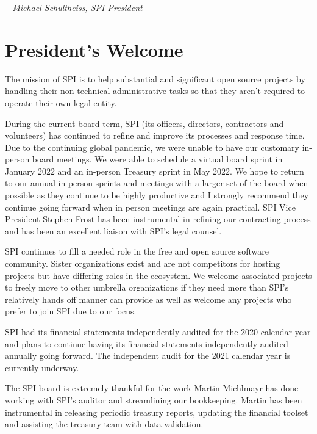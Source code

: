 \documentclass[a4paper]{report}
\begin{document}
  \emph{-- Michael Schultheiss, SPI President}

\newpage

\tableofcontents

\newpage

\chapter{President's Welcome}
\label{sec:president}

The mission of SPI is to help substantial and significant open source
projects by handling their non-technical administrative tasks so that
they aren't required to operate their own legal entity.

During the current board term, SPI (its officers, directors, contractors
and volunteers) has continued to refine and improve its processes and
response time.  Due to the continuing global pandemic, we were unable to
have our customary in-person board meetings. We were able to schedule
a virtual board sprint in January 2022 and an in-person Treasury sprint
in May 2022. We hope to return to our annual in-person sprints and
meetings with a larger set of the board when possible as they continue
to be highly productive and I strongly recommend they continue going
forward when in person meetings are again practical. SPI Vice President
Stephen Frost has been instrumental in refining our contracting process
and has been an excellent liaison with SPI's legal counsel.

SPI continues to fill a needed role in the free and open source software
community. Sister organizations exist and are not competitors for
hosting projects but have differing roles in the ecosystem. We welcome
associated projects to freely move to other umbrella organizations if
they need more than SPI's relatively hands off manner can provide as
well as welcome any projects who prefer to join SPI due to our focus.

SPI had its financial statements independently audited for the 2020 calendar
year and plans to continue having its financial statements independently
audited annually going forward. The independent audit for the 2021 calendar
year is currently underway.

The SPI board is extremely thankful for the work Martin Michlmayr has
done working with SPI's auditor and streamlining our bookkeeping. Martin
has been instrumental in releasing periodic treasury reports, updating
the financial toolset and assisting the treasury team with data
validation.
\end{document}
